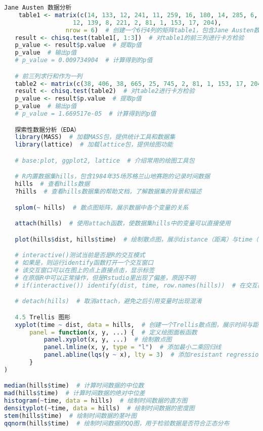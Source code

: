 \documentclass[UTF8]{report}
\theoremstyle{MyLineTheoremStyle} %
\theoremstyle{MyBlockTheoremStyle} %
\theoremstyle{MySubsubsectionStyle} %
\begin{document}
\begin{lstlisting}[language=R]
    Jane Austen 数据分析
    table1 <- matrix(c(14, 133, 12, 241, 11, 259, 16, 180, 14, 285, 6, 265, 8, 93, 
                   12, 139, 8, 221, 2, 81, 1, 153, 17, 204), 
                 nrow = 6)  # 创建一个6行4列的矩阵table1，包含Jane Austen数据
   result <- chisq.test(table1[, 1:3])  # 对table1的前三列进行卡方检验
   p_value <- result$p.value  # 提取p值
   p_value  # 输出p值
   # p_value = 0.009734904  # 计算得到的p值

   # 前三列求行和作为一列
   table2 <- matrix(c(38, 406, 38, 665, 25, 745, 2, 81, 1, 153, 17, 204), nrow = 6)  # 创建一个新的6行4列矩阵table2
   result <- chisq.test(table2)  # 对table2进行卡方检验
   p_value <- result$p.value  # 提取p值
   p_value  # 输出p值
   # p_value = 1.669517e-05  # 计算得到的p值

   探索性数据分析（EDA）
   library(MASS)  # 加载MASS包，提供统计工具和数据集
   library(lattice)  # 加载lattice包，提供绘图功能

   # base:plot, ggplot2, lattice  # 介绍常用的绘图工具包

   # R内置数据集hills，包含1984年35场苏格兰山地赛跑的记录时间数据
   hills  # 查看hills数据
   ?hills  # 查看hills数据集的帮助文档，了解数据集的背景和描述

   splom(~ hills)  # 散点图矩阵，展示数据中各个变量的关系

   attach(hills)  # 使用attach函数，使数据集hills中的变量可以直接使用

   plot(hills$dist, hills$time)  # 绘制散点图，展示distance（距离）与time（时间）的关系

   # interactive()测试当前是否是R的交互模式
   # 如果是，则运行identify函数打开一个交互窗口
   # 该交互窗口可以在图上的点上直接点击，显示标签
   # 在原版R中可以正常操作，但是Rstudio里出现了偏差，原因不明
   # if(interactive()) identify(dist, time, row.names(hills))  # 在交互模式下显示数据点的标签

   # detach(hills)  # 取消attach，避免之后引用变量时出现混淆

   4.5 Trellis 图形
   xyplot(time ~ dist, data = hills,  # 创建一个Trellis散点图，展示时间与距离的关系
       panel = function(x, y, ...) {  # 定义绘图面板函数
           panel.xyplot(x, y, ...)  # 绘制散点图
           panel.lmline(x, y, type = "l")  # 添加最小二乘回归线
           panel.abline(lqs(y ~ x), lty = 3)  # 添加resistant regression线（稳健回归线），lty控制线条类型
       }
)

median(hills$time)  # 计算时间数据的中位数
mad(hills$time)  # 计算时间数据的绝对中位差
histogram(~time, data = hills)  # 绘制时间数据的直方图
densityplot(~time, data = hills)  # 绘制时间数据的密度图
stem(hills$time)  # 绘制时间数据的茎叶图
qqnorm(hills$time)  # 绘制时间数据的QQ图，用于检验数据是否符合正态分布



\end{lstlisting}
\end{document}
